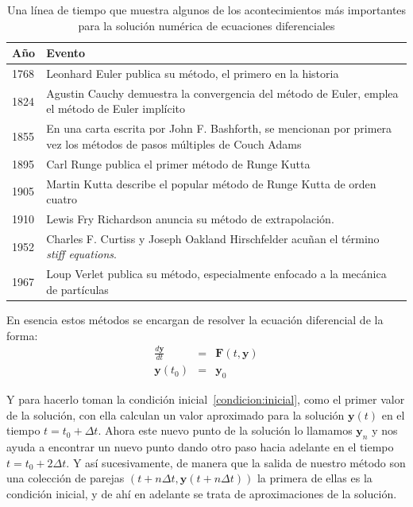 \begin{table}
\begin{center}
\begin{tabular} {@{}lp{12cm}@{}} 
\toprule
Año & Evento \\ 
\midrule
1768 & Leonhard Euler publica su método, el primero en la historia \\
1824 & Agustin Cauchy demuestra la convergencia del método de Euler, emplea el método de Euler implícito \\
1855 & En una carta escrita por John F. Bashforth, se mencionan por primera vez los métodos de pasos múltiples de Couch Adams \\
1895 & Carl Runge publica el primer método de Runge Kutta \\ 
1905 & Martin Kutta describe el popular método de Runge Kutta de orden cuatro \\ 
1910 & Lewis Fry Richardson anuncia su método de extrapolación. \\
1952 & Charles F. Curtiss y Joseph Oakland Hirschfelder acuñan el término \emph{\foreignlanguage{english}{stiff equations}}. \\
1967 & Loup Verlet publica su método, especialmente enfocado a la mecánica de partículas \\ 
\bottomrule
\end{tabular}
\end{center}
\caption[Evolución histórica de los métodos numéricos]{Una línea de tiempo que muestra algunos de los acontecimientos más importantes para la solución numérica de ecuaciones diferenciales}
\label{historia:metodos}
\end{table}

En esencia estos métodos se encargan de resolver la ecuación diferencial de la forma:
\begin{eqnarray}
 \frac{d\textbf{y}}{dt} & = &\textbf{F}(t,\textbf{y}) \nonumber \\
 \textbf{y}(t_0) & = & \textbf{y}_0 \label{condicion:inicial}
\end{eqnarray}

Y para hacerlo toman la condición inicial~\eqref{condicion:inicial}, como el primer valor de la solución, con ella calculan un valor aproximado para la solución $\textbf{y}(t)$ en el tiempo $t = t_0 + \Delta t$.
Ahora este nuevo punto de la solución lo llamamos $\textbf{y}_{n}$ y nos ayuda a encontrar un nuevo punto dando otro paso hacia adelante en el tiempo $t = t_0 + 2\Delta t$.
Y así sucesivamente, de manera que la salida de nuestro método son una colección de parejas $(t + n \Delta t, \textbf{y}(t + n \Delta t) )$ la primera de ellas es la condición inicial, y de ahí en adelante se trata de aproximaciones de la solución.

